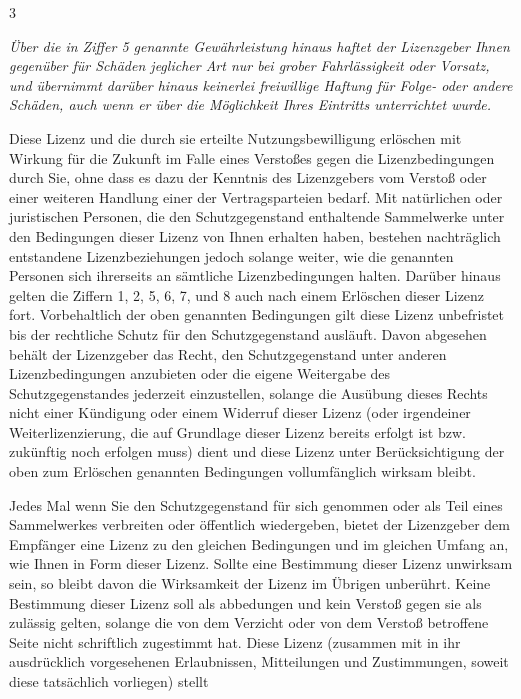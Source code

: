 \begin{WidePar}
\begin{multicols}{3}
\begin{description}
  {\itshape Über die in Ziffer 5 genannte Gewährleistung
  hinaus haftet der Lizenzgeber Ihnen gegenüber für Schäden jeglicher Art
  nur bei grober Fahrlässigkeit oder Vorsatz, und übernimmt
  darüber hinaus keinerlei freiwillige Haftung für Folge- oder
  andere Schäden, auch wenn er über die Möglichkeit Ihres
  Eintritts unterrichtet wurde.}
  \item[7. Erlöschen]
  Diese Lizenz und die durch sie erteilte
  Nutzungsbewilligung erlöschen mit Wirkung für die
  Zukunft im Falle eines Verstoßes gegen die
  Lizenzbedingungen durch Sie, ohne dass es dazu der
  Kenntnis des Lizenzgebers vom Verstoß oder einer
  weiteren Handlung einer der Vertragsparteien bedarf. Mit
  natürlichen oder juristischen Personen, die den
  Schutzgegenstand enthaltende Sammelwerke unter den
  Bedingungen dieser Lizenz von Ihnen erhalten haben,
  bestehen nachträglich entstandene Lizenzbeziehungen
  jedoch solange weiter, wie die genannten Personen sich
  ihrerseits an sämtliche Lizenzbedingungen halten.
  Darüber hinaus gelten die Ziffern 1, 2, 5, 6, 7, und 8
  auch nach einem Erlöschen dieser Lizenz fort.
  Vorbehaltlich der oben genannten Bedingungen gilt diese
  Lizenz unbefristet bis der rechtliche Schutz für den
  Schutzgegenstand ausläuft. Davon abgesehen behält der
  Lizenzgeber das Recht, den Schutzgegenstand unter
  anderen Lizenzbedingungen anzubieten oder die eigene
  Weitergabe des Schutzgegenstandes jederzeit
  einzustellen, solange die Ausübung dieses Rechts nicht
  einer Kündigung oder einem Widerruf dieser Lizenz (oder
  irgendeiner Weiterlizenzierung, die auf Grundlage dieser
  Lizenz bereits erfolgt ist bzw. zukünftig noch erfolgen
  muss) dient und diese Lizenz unter Berücksichtigung der
  oben zum Erlöschen genannten Bedingungen vollumfänglich
  wirksam bleibt.
  \item[8. Sonstige ]
  Jedes Mal wenn Sie den Schutzgegenstand für sich
  genommen oder als Teil eines Sammelwerkes verbreiten
  oder öffentlich wiedergeben, bietet der Lizenzgeber dem
  Empfänger eine Lizenz zu den gleichen Bedingungen und im
  gleichen Umfang an, wie Ihnen in Form dieser Lizenz.
  Sollte eine Bestimmung dieser Lizenz unwirksam sein, so
  bleibt davon die Wirksamkeit der Lizenz im Übrigen
  unberührt.
  Keine Bestimmung dieser Lizenz soll als abbedungen und
  kein Verstoß gegen sie als zulässig gelten, solange die
  von dem Verzicht oder von dem Verstoß betroffene Seite
  nicht schriftlich zugestimmt hat.
  Diese Lizenz (zusammen mit in ihr ausdrücklich
  vorgesehenen Erlaubnissen, Mitteilungen und
  Zustimmungen, soweit diese tatsächlich vorliegen) stellt

\end{description}
\end{multicols}
\end{WidePar}
